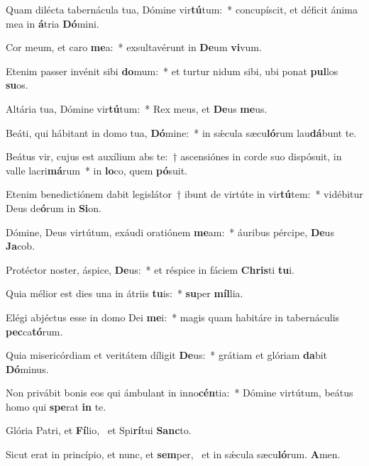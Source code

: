 \item Quam dilécta tabernácula tua, Dómine vir\textbf{tú}tum:~* concupíscit, et déficit ánima mea in \textbf{á}tria \textbf{Dó}mini.
\item Cor meum, et caro \textbf{me}a:~* exsultavérunt in \textbf{De}um \textbf{vi}vum.
\item Etenim passer invénit sibi \textbf{do}mum:~* et turtur nidum sibi, ubi ponat \textbf{pul}los \textbf{su}os.
\item Altária tua, Dómine vir\textbf{tú}\-tum:~* Rex meus, et \textbf{De}us \textbf{me}us.
\item Beáti, qui hábitant in domo tua, \textbf{Dó}mine:~* in sǽcula sæcu\textbf{ló}rum lau\textbf{dá}bunt te.
\item Beátus vir, cujus est auxílium abs te:~† ascensiónes in corde suo dispósuit, in valle lacri\textbf{má}rum~* in \textbf{lo}co, quem \textbf{pó}suit.
\item Etenim benedictiónem dabit legislátor~† ibunt de virtúte in vir\textbf{tú}tem:~* vidébitur Deus de\textbf{ó}rum in \textbf{Si}on.
\item Dómine, Deus virtútum, exáudi oratiónem \textbf{me}am:~* áuribus pércipe, \textbf{De}us \textbf{Ja}cob.
\item Protéctor noster, áspice, \textbf{De}us:~* et réspice in fáciem \textbf{Chris}ti \textbf{tu}i.
\item Quia mélior est dies una in átriis \textbf{tu}is:~* \textbf{su}per \textbf{míl}lia.
\item Elégi abjéctus esse in domo Dei \textbf{me}i:~* magis quam habitáre in tabernáculis \textbf{pec}ca\textbf{tó}rum.
\item Quia misericórdiam et veritátem díligit \textbf{De}us:~* grátiam et glóriam \textbf{da}bit \textbf{Dó}minus.
\item Non privábit bonis eos qui ámbulant in inno\textbf{cén}tia:~* Dómine virtútum, beátus homo qui \textbf{spe}rat \textbf{in} te.
\item Glória Patri, et \textbf{Fí}lio,~\psstar{} et Spi\textbf{rí}tui \textbf{Sanc}to.
\item Sicut erat in princípio, et nunc, et \textbf{sem}per,~\psstar{} et in sǽcula sæcu\textbf{ló}rum. \textbf{A}men.

